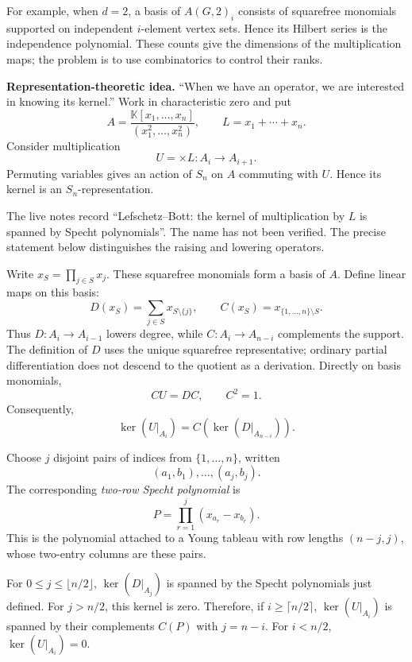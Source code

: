 For example, when $d=2$, a basis of
$A(G,2)_i$ consists of squarefree monomials
supported on independent $i$-element
vertex sets. Hence its Hilbert series is
the independence polynomial.
These counts give the dimensions of the
multiplication maps; the problem is to
use combinatorics to control their ranks.

\medskip\noindent
\textbf{Representation-theoretic idea.}
``When we have an operator, we are
interested in knowing its kernel.''
Work in characteristic zero and put
$$
A=\frac{\mathbb{K}[x_1,\ldots,x_n]}
{(x_1^2,\ldots,x_n^2)},
\qquad L=x_1+\cdots+x_n.
$$
Consider multiplication
$$
U=\times L:A_i\longrightarrow A_{i+1}.
$$
Permuting variables gives an action of
$S_n$ on $A$ commuting with $U$.
Hence its kernel is an $S_n$-representation.

\begin{remark}
\label{remark-specht-attribution}
The live notes record ``Lefschetz--Bott:
the kernel of multiplication by $L$ is
spanned by Specht polynomials''.
The name has not been verified.
The precise statement below distinguishes
the raising and lowering operators.
\end{remark}

Write $x_S=\prod_{j\in S}x_j$.
These squarefree monomials form a basis
of $A$. Define linear maps on this basis:
$$
D(x_S)=\sum_{j\in S}x_{S\setminus\{j\}},
\qquad C(x_S)=x_{\{1,\ldots,n\}\setminus S}.
$$
Thus $D:A_i\longrightarrow A_{i-1}$
lowers degree, while
$C:A_i\longrightarrow A_{n-i}$
complements the support.
The definition of $D$ uses the unique
squarefree representative; ordinary
partial differentiation does not descend
to the quotient as a derivation.
Directly on basis monomials,
$$
CU=DC,\qquad C^2=1.
$$
Consequently,
$$
\ker(U|_{A_i})=C(\ker(D|_{A_{n-i}})).
$$

\begin{definition}
\label{definition-specht-polynomial}
Choose $j$ disjoint pairs of indices
from $\{1,\ldots,n\}$, written
$$
(a_1,b_1),\ldots,(a_j,b_j).
$$
The corresponding \emph{two-row Specht
polynomial} is
$$
P=\prod_{r=1}^{j}(x_{a_r}-x_{b_r}).
$$
This is the polynomial attached to a
Young tableau with row lengths $(n-j,j)$,
whose two-entry columns are these pairs.
\end{definition}

\begin{theorem}
\label{theorem-specht-kernels}
For $0\leq j\leq\lfloor n/2\rfloor$,
$\ker(D|_{A_j})$ is spanned by the
Specht polynomials just defined.
For $j>n/2$, this kernel is zero.
Therefore, if $i\geq\lceil n/2\rceil$,
$\ker(U|_{A_i})$ is spanned by their
complements $C(P)$ with $j=n-i$.
For $i<n/2$, $\ker(U|_{A_i})=0$.
\end{theorem}

